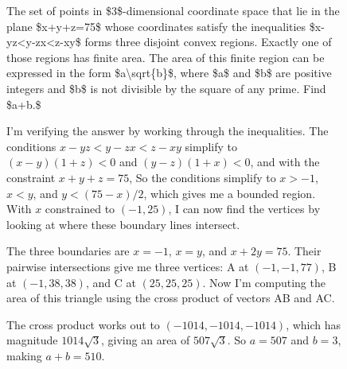\begin{figure}[H]
\centering
\setlength{\columnsep}{12pt}
\setlength{\colw}{\dimexpr(\linewidth-\columnsep)/2\relax}
\begin{promptrow}
\caret{}\par\vspace{4pt}
The set of points in \$3\$-dimensional coordinate space that lie in the plane \$x+y+z=75\$ whose coordinates satisfy the inequalities \$x-yz<y-zx<z-xy\$ forms three disjoint convex regions. Exactly one of those regions has finite area. The area of this finite region can be expressed in the form \$a\textbackslash{}sqrt\{b\}\$, where \$a\$ and \$b\$ are positive integers and \$b\$ is not divisible by the square of any prime. Find \$a+b.\$
\end{promptrow}
\vspace{12pt}
\noindent
\begin{reasoncol}[equal height group=sfB]
  \caret{}\par\vspace{4pt}
  \raggedright
  I'm verifying the answer by working through the inequalities. The conditions \(x-yz<y-zx<z-xy\) simplify to \((x-y)(1+z)<0\) and \((y-z)(1+x)<0\), and with the constraint \(x+y+z=75\),  So the conditions simplify to \(x>-1\), \(x<y\), and \(y<(75-x)/2\), which gives me a bounded region. With \(x\) constrained to \((-1,25)\), I can now find the vertices by looking at where these boundary lines intersect.\par\vspace{3pt}
  The three boundaries are \(x=-1\), \(x=y\), and \(x+2y=75\). Their pairwise intersections give me three vertices: A at \((-1,-1,77)\), B at \((-1,38,38)\), and C at \((25,25,25)\). Now I'm computing the area of this triangle using the cross product of vectors AB and AC.\par\vspace{3pt}
  The cross product works out to \((-1014,-1014,-1014)\), which has magnitude \(1014\sqrt3\), giving an area of \(507\sqrt3\). So \(a=507\) and \(b=3\), making \(a+b=510\).
\end{reasoncol}\hspace{\columnsep}%
\begin{reasoncol}[equal height group=sfB]
  \caret{}\par\vspace{4pt}
  \raggedright
  \par\vspace{2pt}

\end{reasoncol}
\end{figure}
